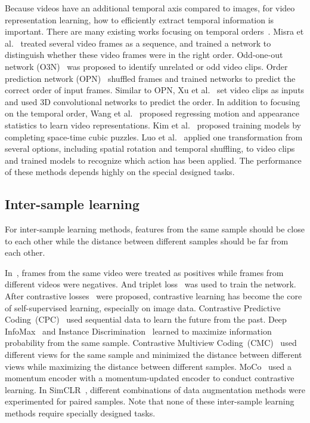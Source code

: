 \documentclass[sigconf]{acmart}
\begin{document}
Because videos have an additional temporal axis compared to images, for video representation learning, how to efficiently extract temporal information is important. There are many existing works focusing on temporal orders~\cite{misra2016shuffle,fernando2017self,lee2017unsupervised,xu2019self}. Misra et al.~\cite{misra2016shuffle} treated several video frames as a sequence, and trained a network to distinguish whether these video frames were in the right order. Odd-one-out network (O3N)~\cite{fernando2017self} was proposed to identify unrelated or odd video clips. Order prediction network (OPN)~\cite{lee2017unsupervised} shuffled frames and trained networks to predict the correct order of input frames. Similar to OPN, Xu et al.~\cite{xu2019self} set video clips as inputs and used 3D convolutional networks to predict the order. In addition to focusing on the temporal order, Wang et al.~\cite{wang2019self} proposed regressing motion and appearance statistics to learn video representations. Kim et al.~\cite{kim2019self} proposed training models by completing space-time cubic puzzles. Luo et al.~\cite{luo2020video} applied one transformation from several options, including spatial rotation and temporal shuffling, to video clips and trained models to recognize which action has been applied. The performance of these methods depends highly on the special designed tasks.

\subsection{Inter-sample learning}
For inter-sample learning methods, features from the same sample should be close to each other while the distance between different samples should be far from each other. 


In~\cite{sermanet2018time}, frames from the same video were treated as positives while frames from different videos were negatives. And triplet loss~\cite{hermans2017defense} was used to train the network. After contrastive losses~\cite{hadsell2006dimensionality} were proposed, contrastive learning has become the core of self-supervised learning, especially on image data. Contrastive Predictive Coding~(CPC)~\cite{oord2018representation} used sequential data to learn the future from the past. Deep InfoMax~\cite{hjelm2018learning} and Instance Discrimination~\cite{wu2018unsupervised} learned to maximize information probability from the same sample. Contrastive Multiview Coding~(CMC)~\cite{tian2019contrastive} used different views for the same sample and minimized the distance between different views while maximizing the distance between different samples. 
MoCo~\cite{he2019momentum} used a momentum encoder with a momentum-updated encoder to conduct contrastive learning. In SimCLR~\cite{chen2020simple}, different combinations of data augmentation methods were experimented for paired samples. Note that none of these inter-sample learning methods require specially designed tasks.
\end{document}
